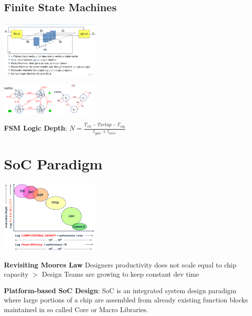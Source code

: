 \documentclass[english]{latex4ei/latex4ei_sheet}
\begin{document}
    
\subsection{Finite State Machines}
    \begin{center}
        \includegraphics[width = 5cm]{images/2. SoC Logic Design Recap/FSM.png}
    \end{center}    
    \begin{center}
        \includegraphics[width = 5cm]{images/2. SoC Logic Design Recap/MooreMealy.png}
    \end{center}    

    \textbf{FSM Logic Depth}: $N = \frac{T_{clk} - T{setup} - T_{c2q}}{t_{gate} + t_{wire}}$



\section{SoC Paradigm}
    \begin{center}
        \includegraphics[width = 5cm]{images/3.SoCParadigm/Paradigm.png}
    \end{center}    

\textbf{Revisiting Moores Law} Designers productivity does not scale equal to chip capacity $>$ Design Teams are growing to keep constant dev time

\textbf{Platform-based SoC Design}: SoC is an integrated system design paradigm where large portions of a chip are assembled from already existing function blocks maintained in so called Core or Macro Libraries.
\end{document}
